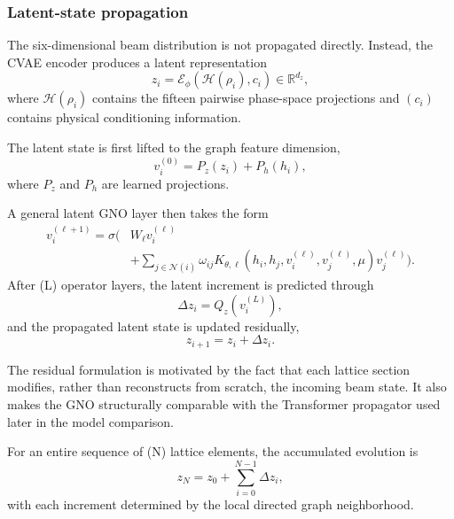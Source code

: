 \subsubsection{Latent-state propagation}
\label{subsubsec:gno_latent_propagation}

The six-dimensional beam distribution is not propagated directly. Instead, the CVAE encoder produces a latent representation
\begin{equation}
z_i
=
\mathcal{E}_{\phi}
\left(
\mathcal{H}(\rho_i),
c_i
\right)
\in
\mathbb{R}^{d_z},
\label{eq:gno_latent_state}
\end{equation}
where $\mathcal{H}(\rho_i)$ contains the fifteen pairwise phase-space projections and $(c_i)$ contains physical conditioning information.

The latent state is first lifted to the graph feature dimension,
\begin{equation}
v_i^{(0)}
=
P_z(z_i)
+
P_h(h_i),
\label{eq:gno_latent_lift}
\end{equation}
where $P_z$ and $P_h$ are learned projections.

A general latent GNO layer then takes the form
\begin{equation}
\begin{split}
v_i^{(\ell+1)}
=
\sigma
\Bigg(
&
W_{\ell}v_i^{(\ell)}
\\
&+
\sum_{j\in\mathcal{N}(i)}
\omega_{ij}
K_{\theta,\ell}
\left(
h_i,
h_j,
v_i^{(\ell)},
v_j^{(\ell)},
\mu
\right)
v_j^{(\ell)}
\Bigg).
\end{split}
\label{eq:gno_latent_layer}
\end{equation}
After (L) operator layers, the latent increment is predicted through
\begin{equation}
\Delta z_i
=
Q_z
\left(
v_i^{(L)}
\right),
\label{eq:gno_latent_increment}
\end{equation}
and the propagated latent state is updated residually,
\begin{equation}
z_{i+1}
=
z_i
+
\Delta z_i.
\label{eq:gno_residual_update}
\end{equation}

The residual formulation is motivated by the fact that each lattice section modifies, rather than reconstructs from scratch, the incoming beam state. It also makes the GNO structurally comparable with the Transformer propagator used later in the model comparison.

For an entire sequence of (N) lattice elements, the accumulated evolution is
\begin{equation}
z_N
=
z_0
+
\sum_{i=0}^{N-1}
\Delta z_i,
\label{eq:gno_cumulative_latent_evolution}
\end{equation}
with each increment determined by the local directed graph neighborhood.

